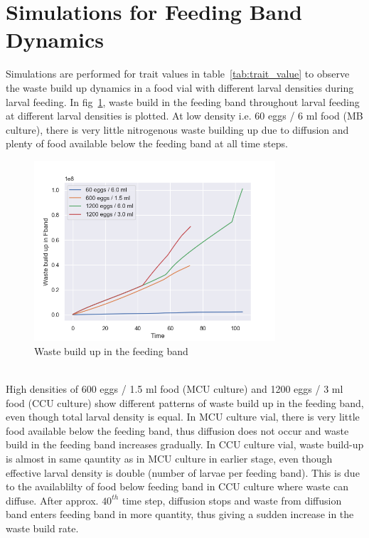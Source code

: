 \section{Simulations for Feeding Band Dynamics}
Simulations are performed for trait values in table~\ref{tab:trait_value} to observe the waste build up dynamics in a food vial with different larval densities during larval feeding. In fig~\ref{fig:waste}, waste build in the feeding band throughout larval feeding at different larval densities is plotted. At low density i.e. 60 eggs / 6 ml food (MB culture), there is very little nitrogenous waste building up due to diffusion and plenty of food available below the feeding band at all time steps.
\begin{figure}[h]
  \centering
  \includegraphics[width=0.8\textwidth]{C2/Figs/waste_build_up}
  \caption{Waste build up in the feeding band}
  \label{fig:waste}
\end{figure}\\
High densities of 600 eggs / 1.5 ml food (MCU culture) and 1200 eggs / 3 ml food (CCU culture) show different patterns of waste build up in the feeding band, even though total larval density is equal. In MCU culture vial, there is very little food available below the feeding band, thus diffusion does not occur and waste build in the feeding band increases gradually. In CCU culture vial, waste build-up is almost in same qauntity as in MCU culture in earlier stage, even though effective larval density is double (number of larvae per feeding band). This is due to the availablilty of food below feeding band in CCU culture where waste can diffuse. After approx. $40^{th}$ time step, diffusion stops and waste from diffusion band enters feeding band in more quantity, thus giving a sudden increase in the waste build rate. \\ \\
